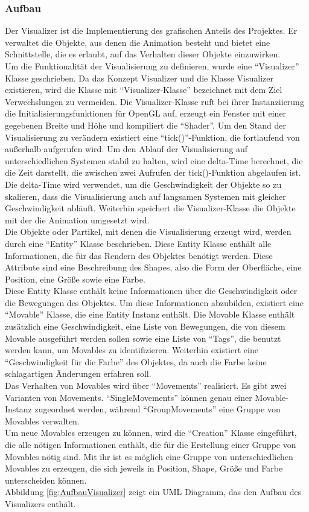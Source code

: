 \documentclass[11pt,a4paper]{article}
\begin{document}
\subsubsection{Aufbau}
Der Visualizer ist die Implementierung des grafischen Anteils des Projektes. Er verwaltet die Objekte, aus denen die Animation besteht und bietet eine Schnittstelle, die es erlaubt, auf das Verhalten dieser Objekte einzuwirken.\\
Um die Funktionalität der Visualisierung zu definieren, wurde eine ``Visualizer'' Klasse geschrieben. Da das Konzept Visualizer und die Klasse Visualizer existieren, wird die Klasse mit ``Visualizer-Klasse'' bezeichnet mit dem Ziel Verwechslungen zu vermeiden. Die Visualizer-Klasse ruft bei ihrer Instanziierung die Initialisierungsfunktionen für OpenGL auf, erzeugt ein Fenster mit einer gegebenen Breite und Höhe und kompiliert die ``Shader''. Um den Stand der Visualisierung zu verändern existiert eine ``tick()''-Funktion, die fortlaufend von außerhalb aufgerufen wird. Um den Ablauf der Visualisierung auf unterschiedlichen Systemen stabil zu halten, wird eine delta-Time berechnet, die die Zeit darstellt, die zwischen zwei Aufrufen der tick()-Funktion abgelaufen ist. Die delta-Time wird verwendet, um die Geschwindigkeit der Objekte so zu skalieren, dass die Visualisierung auch auf langsamen Systemen mit gleicher Geschwindigkeit abläuft. Weiterhin speichert die Visualizer-Klasse die Objekte mit der die Animation umgesetzt wird.\\
Die Objekte oder Partikel, mit denen die Visualisierung erzeugt wird, werden durch eine ``Entity'' Klasse beschrieben. Diese Entity Klasse enthält alle Informationen, die für das Rendern des Objektes benötigt werden. Diese Attribute sind eine Beschreibung des Shapes, also die Form der Oberfläche, eine Position, eine Größe sowie eine Farbe.\\
Diese Entity Klasse enthält keine Informationen über die Geschwindigkeit oder die Bewegungen des Objektes. Um diese Informationen abzubilden, existiert eine ``Movable'' Klasse, die eine Entity Instanz enthält. Die Movable Klasse enthält zusätzlich eine Geschwindigkeit, eine Liste von Bewegungen, die von diesem Movable ausgeführt werden sollen sowie eine Liste von ``Tags'', die benutzt werden kann, um Movables zu identifizieren. Weiterhin existiert eine ``Geschwindigkeit für die Farbe''  des Objektes, da auch die Farbe keine schlagartigen Änderungen erfahren soll.\\
Das Verhalten von Movables wird über ``Movements'' realisiert. Es gibt zwei Varianten von Movements. ``SingleMovements'' können genau einer Movable-Instanz zugeordnet werden, während ``GroupMovements'' eine Gruppe von Movables verwalten.\\
Um neue Movables erzeugen zu können, wird die ``Creation'' Klasse eingeführt, die alle nötigen Informationen enthält, die für die Erstellung einer Gruppe von Movables nötig sind. Mit ihr ist es möglich eine Gruppe von unterschiedlichen Movables zu erzeugen, die sich jeweils in Position, Shape, Größe und Farbe unterscheiden können.\\
Abbildung \ref{fig:AufbauVisualizer} zeigt ein UML Diagramm, das den Aufbau des Visualizers enthält.\\
\end{document}
